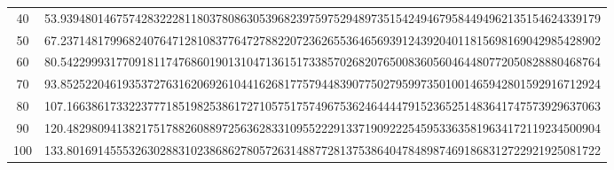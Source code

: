\documentclass[final]{article}
\begin{document}
\begin{table}
\begin{center}
\begin{tabular}{|c|c|}
\\
40  &   53.939480146757428322281180378086305396823975975294897351542494679584494962135154624339179%
\\
50  &   67.237148179968240764712810837764727882207236265536465693912439204011815698169042985428902%
\\
60  &   80.542299931770918117476860190131047136151733857026820765008360560464480772050828880468764%
\\
70  &   93.852522046193537276316206926104416268177579448390775027959973501001465942801592916712924%
\\
80  &   107.16638617332237771851982538617271057517574967536246444479152365251483641747573929637063%
\\
90  &   120.48298094138217517882608897256362833109552229133719092225459533635819634172119234500904%
\\
100 &   133.80169145553263028831023868627805726314887728137538640478489874691868312722921925081722%
\\
\hline
\end{tabular}
\end{center}
\bigskip\bigskip
\end{table}
\end{document}
